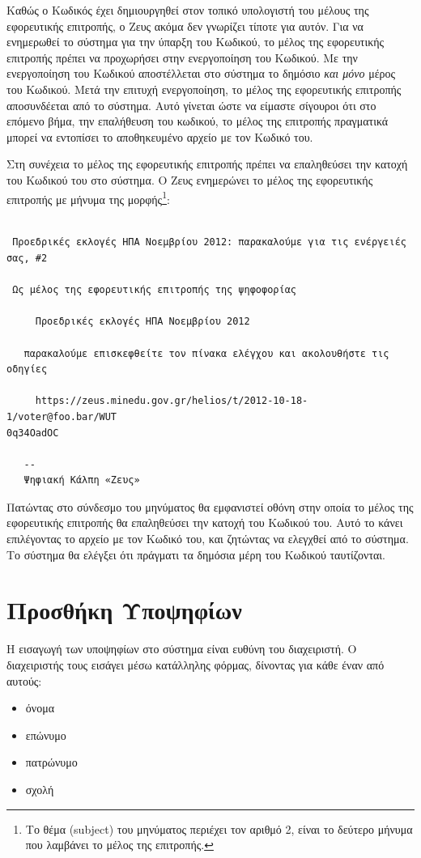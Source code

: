 \documentclass{tufte-handout}
\begin{document}
Καθώς ο Κωδικός έχει δημιουργηθεί στον τοπικό υπολογιστή του μέλους
της εφορευτικής επιτροπής, ο Ζευς ακόμα δεν γνωρίζει τίποτε για αυτόν.
Για να ενημερωθεί το σύστημα για την ύπαρξη του Κωδικού, το μέλος της
εφορευτικής επιτροπής πρέπει να προχωρήσει στην ενεργοποίηση του
Κωδικού. Με την ενεργοποίηση του Κωδικού αποστέλλεται στο σύστημα το
δημόσιο \emph{και μόνο} μέρος του Κωδικού. Μετά την επιτυχή
ενεργοποίηση, το μέλος της εφορευτικής επιτροπής αποσυνδέεται από το
σύστημα. Αυτό γίνεται ώστε να είμαστε σίγουροι ότι στο επόμενο
βήμα, την επαλήθευση του κωδικού, το μέλος της επιτροπής πραγματικά
μπορεί να εντοπίσει το αποθηκευμένο αρχείο με τον Κωδικό του.

Στη συνέχεια το μέλος της εφορευτικής επιτροπής πρέπει να επαληθεύσει
την κατοχή του Κωδικού του στο σύστημα. Ο Ζευς ενημερώνει το μέλος της
εφορευτικής επιτροπής με μήνυμα της μορφής\footnote{Το θέμα (subject)
  του μηνύματος περιέχει τον αριθμό 2, είναι το δεύτερο μήνυμα που
  λαμβάνει το μέλος της επιτροπής.}:
\begin{verbatim}

 Προεδρικές εκλογές ΗΠΑ Νοεμβρίου 2012: παρακαλούμε για τις ενέργειές σας, #2

 Ως μέλος της εφορευτικής επιτροπής της ψηφοφορίας

     Προεδρικές εκλογές ΗΠΑ Νοεμβρίου 2012

   παρακαλούμε επισκεφθείτε τον πίνακα ελέγχου και ακολουθήστε τις οδηγίες

     https://zeus.minedu.gov.gr/helios/t/2012-10-18-1/voter@foo.bar/WUT
0q34OadOC

   --
   Ψηφιακή Κάλπη «Ζευς»
\end{verbatim}

\noindent Πατώντας στο σύνδεσμο του μηνύματος θα εμφανιστεί οθόνη στην
οποία το μέλος της εφορευτικής επιτροπής θα επαληθεύσει την κατοχή του
Κωδικού του. Αυτό το κάνει επιλέγοντας το αρχείο με τον Κωδικό του,
και ζητώντας να ελεγχθεί από το σύστημα. Το σύστημα θα ελέγξει ότι
πράγματι τα δημόσια μέρη του Κωδικού ταυτίζονται.

\section{Προσθήκη Υποψηφίων}

Η εισαγωγή των υποψηφίων στο σύστημα είναι ευθύνη του διαχειριστή. Ο
διαχειριστής τους εισάγει μέσω κατάλληλης φόρμας, δίνοντας για κάθε
έναν από αυτούς:
\begin{itemize}
\item όνομα
\item επώνυμο
\item πατρώνυμο
\item σχολή
\end{itemize}
\end{document}
